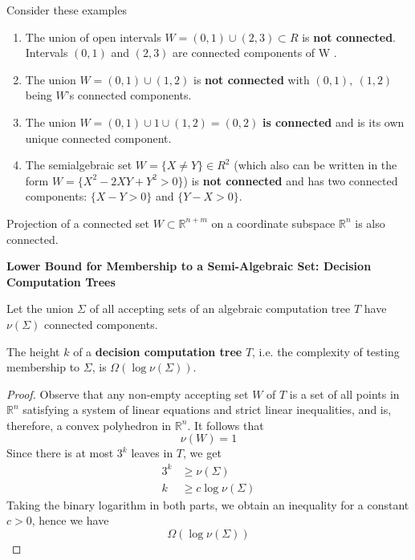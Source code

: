 \begin{example}
    Consider these examples
    \begin{enumerate}
        \item The union of open intervals $W = (0, 1) \cup (2, 3) \subset R$ is \textbf{not connected}.
            Intervals $(0, 1)$ and $(2, 3)$ are connected components of W .
        \item The union $W = (0, 1) \cup (1, 2)$ is \textbf{not connected} with $(0, 1),\ (1, 2)$ being $W$’s connected components.
        \item The union $W = (0, 1) \cup 1 \cup (1, 2) = (0, 2)$ \textbf{is connected} and is its own unique connected component.
        \item The semialgebraic set $W = \{X \neq Y \} \in R^2$
            (which also can be written in the form $W = \{X^2 − 2XY + Y^2 > 0\}$)
            is \textbf{not connected} and has two connected components: $\{X − Y > 0\}$ and $\{Y − X > 0\}$.
    \end{enumerate}
\end{example}

\begin{theorem}
    Projection of a connected set $W \subset \mathbb{R}^{n+m}$
    on a coordinate subspace $\mathbb{R}^n$ is also connected.
\end{theorem}

\textbf{Lower Bound for Membership to a Semi-Algebraic Set: Decision Computation Trees}

\begin{definition}
    Let the union $\Sigma$ of all accepting sets
    of an algebraic computation tree $T$
    have $\nu(\Sigma)$ connected components.
\end{definition}

\begin{theorem}
    The height $k$ of a \textbf{decision computation tree} $T$,
    i.e. the complexity of testing membership to $\Sigma$,
    is $\Omega(\log\nu(\Sigma))$.
\end{theorem}

\begin{proof}
    Observe that any non-empty accepting set $W$ of $T$
    is a set of all points in $\mathbb{R}^n$ satisfying a system of linear equations and strict linear inequalities,
    and is, therefore, a convex polyhedron in $\mathbb{R}^n$.  It follows that
    $$\nu(W) = 1$$
    Since there is at most $3^k$ leaves in $T$, we get
    \begin{align*}
                3^k &\geq \nu(\Sigma) \\
                  k &\geq c\log \nu(\Sigma)
    \end{align*}
    Taking the binary logarithm in both parts,
    we obtain an inequality for a constant $c > 0$,
    hence we have
    $$\Omega(\log\nu(\Sigma))$$
\end{proof}

